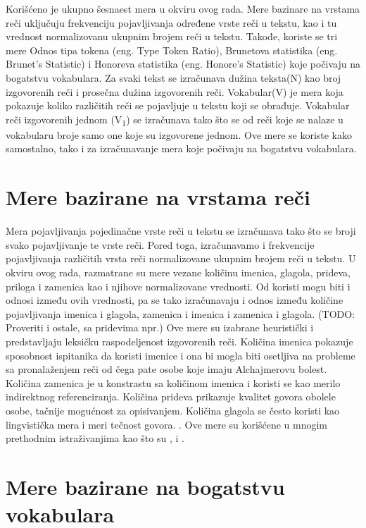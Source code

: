 \documentclass[12pt,oneside]{memoir}
\begin{document}
Korišćeno je ukupno šesnaest mera u okviru ovog rada.  Mere bazinare na vrstama reči uključuju frekvenciju pojavljivanja određene vrste reči u tekstu, kao i tu vrednost normalizovanu ukupnim brojem reči u tekstu. Takođe,  koriste se tri mere Odnos tipa tokena (eng.  Type Token Ratio),  Brunetova statistika (eng. Brunet's Statistic) i Honoreva statistika (eng.  Honore's Statistic) koje počivaju na bogatstvu vokabulara. 
Za svaki tekst se izračunava dužina teksta(N) kao broj izgovorenih reči i prosečna dužina izgovorenih reči.  Vokabular(V) je mera koja pokazuje koliko različitih reči se pojavljuje u tekstu koji se obrađuje.  Vokabular reči izgovorenih jednom (V\textsubscript{1}) se izračunava tako što se od reči koje se nalaze u vokabularu broje samo one koje su izgovorene jednom.  Ove mere se koriste kako samostalno, tako i za izračunavanje mera koje počivaju na bogatstvu vokabulara. 
\break

\section{Mere bazirane na vrstama reči}

Mera pojavljivanja pojedinačne vrste reči u tekstu se izračunava tako što se broji svako pojavljivanje te vrste reči.  Pored toga,  izračunavamo i frekvencije pojavljivanja različitih vrsta reči normalizovane ukupnim brojem reči u tekstu.  U okviru ovog rada, razmatrane su mere vezane količinu imenica,  glagola,  prideva, priloga i zamenica kao i njihove normalizovane vrednosti.  Od koristi mogu biti i odnosi između ovih vrednosti, pa se tako izračunavaju i odnos između količine pojavljivanja imenica i glagola,  zamenica i imenica i zamenica i glagola.  (TODO: Proveriti i ostale, sa pridevima npr.) Ove mere su izabrane heuristički i predstavljaju leksičku raspodeljenost izgovorenih reči.  
Količina imenica pokazuje sposobnost ispitanika da koristi imenice i ona bi mogla biti osetljiva na probleme sa pronalaženjem reči od čega pate osobe koje imaju Alchajmerovu bolest. Količina zamenica je u konstrastu sa količinom imenica i koristi se kao merilo indirektnog referenciranja.  Količina prideva prikazuje kvalitet govora obolele osobe, tačnije mogućnost za opisivanjem. Količina glagola se često koristi kao lingvistička mera i meri tečnost govora. \cite{Evaloftechfolexicalperformance}.  Ove mere su korišćene u mnogim prethodnim istraživanjima kao što su \cite{automaticdetandrat}, \cite{Evaloftechfolexicalperformance} i \cite{linguisticfeatures}. 

\section{Mere bazirane na bogatstvu vokabulara}
 
\end{document}
